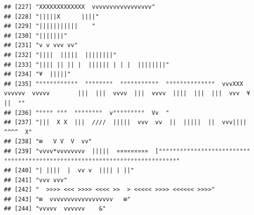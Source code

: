 \documentclass[
]{article}
\begin{document}
\begin{verbatim}
## [227] "XXXXXXXXXXXXX  vvvvvvvvvvvvvvvvv"                                                                                                         
## [228] "|||||X      ||||"                                                                                                                         
## [229] "|||||||||||    "                                                                                                                          
## [230] "|||||||"                                                                                                                                  
## [231] "v v vvv vv"                                                                                                                               
## [232] "||||  |||||  ||||||||"                                                                                                                    
## [233] "|||| || || |  |||||| | | |  ||||||||"                                                                                                     
## [234] "¥  |||||"                                                                                                                                 
## [235] "°°°°°°°°°°°  °°°°°°°°  °°°°°°°°°°°  °°°°°°°°°°°°°°  vvvXXX  vvvvvv  vvvvv        |||  |||  vvvv  |||  vvvv  ||||  |||  |||  vvv  ¥  ||  °"
## [236] "°°°° °°°  °°°°°°°°  v°°°°°°°°°  Vv  "                                                                                                     
## [237] "|||  X X  |||  ////  |||||  vvv  vv  ||  |||||  ||  vvv||||  ^^^^  X"                                                                     
## [238] "⊞   V V  V  vv"                                                                                                                           
## [239] "vvvv*vvvvvvvv  |||||  ¤¤¤¤¤¤¤¤¤  [°°°°°°°°°°°°°°°°°°°°°°°°°°°°°°°°°°°°°°°°°°°°°°°°°°°°°°°°°°°°°°°°°°°°°°°°°°°"                            
## [240] "| ||||  |  vv v  |||| | ||"                                                                                                               
## [241] "vvv vvv"                                                                                                                                  
## [242] "  >>>> <<< >>>> <<<< >>  > <<<<< >>>> <<<<<< >>>>"                                                                                        
## [243] "⊞  vvvvvvvvvvvvvvvvvv   ⊞"                                                                                                                
## [244] "vvvvv  vvvvvv    &"                                                                                                                       

\end{verbatim}
\end{document}
